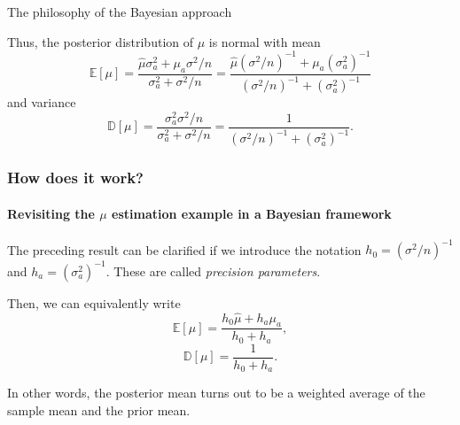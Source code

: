 \documentclass[10pt]{beamer}
\theoremstyle{definition}
\begin{document}
\begin{section}{The philosophy of the Bayesian approach}
\begin{frame}[fragile]
Thus, the posterior distribution of $\mu$ is normal with mean
$$\mathbb{E}[\mu]=\frac{\hat{\mu}\sigma^2_a+\mu_a\sigma^2/n}{\sigma^2_a+\sigma^2/n}=\frac{\hat{\mu}(\sigma^2/n)^{-1}+\mu_a(\sigma_a^2)^{-1}}{(\sigma^2/n)^{-1}+(\sigma^2_a)^{-1}}$$
and variance
$$\mathbb{D}[\mu]=\frac{\sigma^2_a\sigma^2/n}{\sigma^2_a+\sigma^2/n}=\frac{1}{(\sigma^2/n)^{-1}+(\sigma^2_a)^{-1}}.$$
\end{frame}

\begin{frame}[fragile]
\frametitle{How does it work?}
\framesubtitle{Revisiting the $ \mu $ estimation example in a Bayesian framework}
The preceding result can be clarified if we introduce the notation $h_0=(\sigma^2/n)^{-1}$ and $h_a=(\sigma^2_a)^{-1}$. These are called \emph{precision parameters}. \bigskip

Then, we can equivalently write 
\[ \mathbb{E}[\mu]=\dfrac{h_0\hat{\mu}+h_a\mu_a}{h_0+h_a}, \]  \[ \mathbb{D}[\mu]=\frac{1}{h_0+h_a}. \]\bigskip

In other words, the posterior mean turns out to be a weighted average of the sample mean and the prior mean.
\end{frame}
\end{section}
\end{document}
